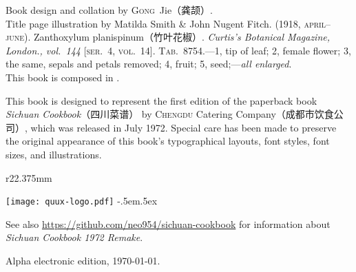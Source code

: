 Book design and collation by \textsc{Gong}~Jie\!（龚颉）\!\!\!.\\
Title page illustration by Matilda Smith \& John Nugent Fitch. (1918,
\textsc{april--june}). Zanthoxylum planispinum\!（竹叶花椒）\!\!\!.
\textit{Curtis's Botanical Magazine, London., vol.~144} [\textsc{ser}.~4,
\textsc{vol}.~14]. \textsc{Tab}.~8754.---1, tip of leaf; 2, female flower;
3, the same, sepals and petals removed; 4, fruit; 5, seed;---\textit{all
enlarged}.\\
This book is composed in \XeLaTeX.

This book is designed to represent the first edition of the paperback book
\textit{Sichuan Cookbook}{\kafamily（四川菜谱）}\!\!\! by \textsc{Chengdu}
Catering Company\!（成都市饮食公司）\!\!\!, which was released in July 1972.
Special care has been made to preserve the original appearance of this book's
typographical layouts, font styles, font sizes, and illustrations.

\begin{wrapfigure}{r}{22.375mm}%
\vspace{-2.8125\baselineskip}%
\begin{flushright}%
\texttt{[image: quux-logo.pdf]}%
{\sffamily\tiny\kern-.5em\lower.5ex\hbox{\texttrademark}}%
\end{flushright}%
\vspace{-1.75\baselineskip}%
\end{wrapfigure}%

See also \url{https://github.com/neo954/sichuan-cookbook} for information
about \textit{Sichuan Cookbook 1972 Remake}.

Alpha electronic edition, \today.

\endgroup%

